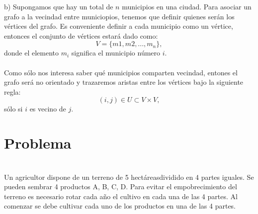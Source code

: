 \documentclass[autocontact]{gaceta}
\begin{document}
    
    \pagebreak

    b) Supongamos que hay un total de $n$ municipios en una ciudad. Para asociar un grafo a 
    la vecindad entre municiopios, tenemos que definir quienes serán los vértices del grafo. Es 
    conveniente definir a cada municipio como un vértice, entonces el conjunto de vértices 
    estará dado como:
    \begin{equation}
        V = \{ m1, m2, ... , m_n \},
    \end{equation}
    donde el elemento $m_i$ significa el municipio número $i$.\\
    \\Como sólo nos interesa saber qué municipios comparten vecindad, entones el grafo será no 
    orientado y trazaremos aristas entre los vértices bajo la siguiente regla:
    \begin{equation}
        (i, j) \in U \subset V \times V,
    \end{equation}
    sólo si $i$ es vecino de $j$.
\section{Problema}


\section{}
        Un agricultor dispone de un terreno de 5 hectáreasdividido en 4 partes iguales. Se 
        pueden sembrar 4 productos A, B, C, D. Para evitar el empobrecimiento del terreno 
        es necesario rotar cada año el cultivo en cada una de las 4 partes. Al comenzar se 
        debe cultivar cada uno de los productos en una de las 4 partes.
\end{document}
